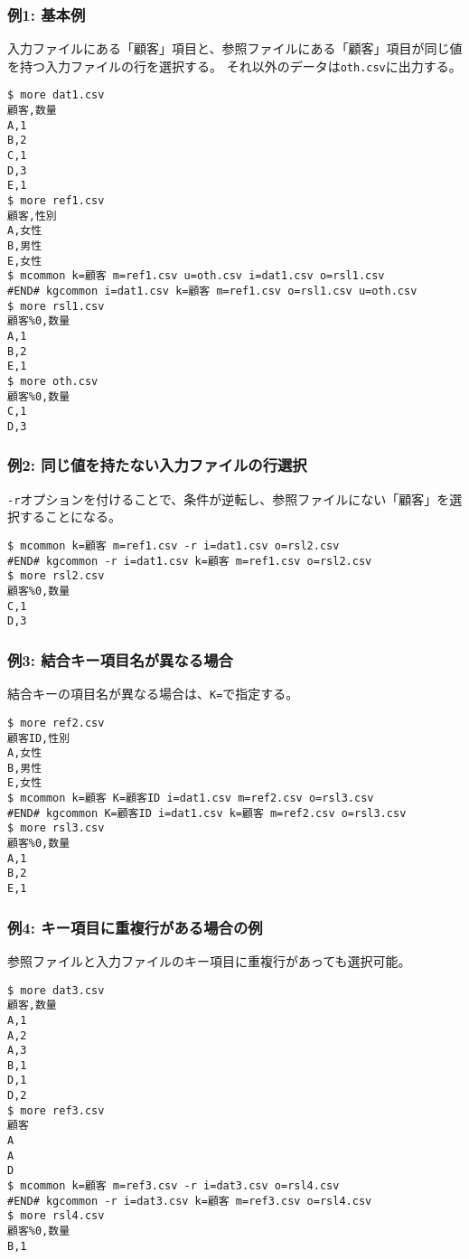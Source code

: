 \subsubsection*{例1: 基本例}

入力ファイルにある「顧客」項目と、参照ファイルにある「顧客」項目が同じ値を持つ入力ファイルの行を選択する。
それ以外のデータは\verb|oth.csv|に出力する。


\begin{Verbatim}[baselinestretch=0.7,frame=single]
$ more dat1.csv
顧客,数量
A,1
B,2
C,1
D,3
E,1
$ more ref1.csv
顧客,性別
A,女性
B,男性
E,女性
$ mcommon k=顧客 m=ref1.csv u=oth.csv i=dat1.csv o=rsl1.csv
#END# kgcommon i=dat1.csv k=顧客 m=ref1.csv o=rsl1.csv u=oth.csv
$ more rsl1.csv
顧客%0,数量
A,1
B,2
E,1
$ more oth.csv
顧客%0,数量
C,1
D,3
\end{Verbatim}
\subsubsection*{例2: 同じ値を持たない入力ファイルの行選択}

\verb|-r|オプションを付けることで、条件が逆転し、参照ファイルにない「顧客」を選択することになる。


\begin{Verbatim}[baselinestretch=0.7,frame=single]
$ mcommon k=顧客 m=ref1.csv -r i=dat1.csv o=rsl2.csv
#END# kgcommon -r i=dat1.csv k=顧客 m=ref1.csv o=rsl2.csv
$ more rsl2.csv
顧客%0,数量
C,1
D,3
\end{Verbatim}
\subsubsection*{例3: 結合キー項目名が異なる場合}

結合キーの項目名が異なる場合は、\verb|K=|で指定する。


\begin{Verbatim}[baselinestretch=0.7,frame=single]
$ more ref2.csv
顧客ID,性別
A,女性
B,男性
E,女性
$ mcommon k=顧客 K=顧客ID i=dat1.csv m=ref2.csv o=rsl3.csv
#END# kgcommon K=顧客ID i=dat1.csv k=顧客 m=ref2.csv o=rsl3.csv
$ more rsl3.csv
顧客%0,数量
A,1
B,2
E,1
\end{Verbatim}
\subsubsection*{例4: キー項目に重複行がある場合の例}

参照ファイルと入力ファイルのキー項目に重複行があっても選択可能。


\begin{Verbatim}[baselinestretch=0.7,frame=single]
$ more dat3.csv
顧客,数量
A,1
A,2
A,3
B,1
D,1
D,2
$ more ref3.csv
顧客
A
A
D
$ mcommon k=顧客 m=ref3.csv -r i=dat3.csv o=rsl4.csv
#END# kgcommon -r i=dat3.csv k=顧客 m=ref3.csv o=rsl4.csv
$ more rsl4.csv
顧客%0,数量
B,1
\end{Verbatim}
